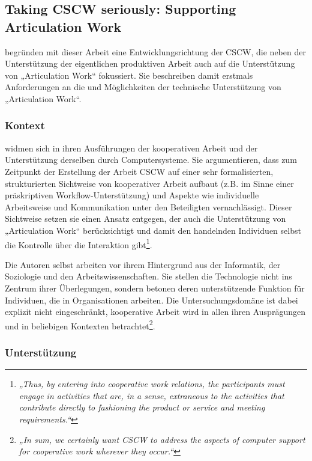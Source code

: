 
\subsection{Taking CSCW seriously: Supporting Articulation Work}

\citet{Schmidt92} begründen mit dieser Arbeit eine Entwicklungsrichtung der \gls{CSCW}, die neben der Unterstützung der eigentlichen produktiven Arbeit auch auf die Unterstützung von „Articulation Work“ fokussiert. Sie beschreiben damit erstmals Anforderungen an die und Möglichkeiten der technische Unterstützung von „Articulation Work“.

\subsubsection{Kontext}

\citet{Schmidt92} widmen sich in ihren Ausführungen der kooperativen Arbeit und der Unterstützung derselben durch Computersysteme. Sie argumentieren, dass zum Zeitpunkt der Erstellung der Arbeit \gls{CSCW} auf einer sehr formalisierten, strukturierten Sichtweise von kooperativer Arbeit aufbaut (z.B. im Sinne einer präskriptiven Workflow-Unterstützung) und Aspekte wie individuelle Arbeitsweise und Kommunikation unter den Beteiligten vernachlässigt. Dieser Sichtweise setzen sie einen Ansatz entgegen, der auch die Unterstützung von „Articulation Work“ berücksichtigt und damit den handelnden Individuen selbst die Kontrolle über die Interaktion gibt\footnote{\emph{„Thus, by entering into cooperative work relations, the participants must engage in activities that are, in a sense, extraneous to the activities that contribute directly to fashioning the product or service and meeting requirements.“}\citep[][S. 8]{Schmidt92}}.

Die Autoren selbst arbeiten vor ihrem Hintergrund aus der Informatik, der Soziologie und den Arbeitswissenschaften. Sie stellen die Technologie nicht ins Zentrum ihrer Überlegungen, sondern betonen deren unterstützende Funktion für  Individuen, die in Organisationen arbeiten. Die Untersuchungsdomäne ist dabei explizit nicht eingeschränkt, kooperative Arbeit wird in allen ihren Ausprägungen und in beliebigen Kontexten betrachtet\footnote{\emph{„In sum, we certainly want CSCW to address the aspects of computer support for cooperative work wherever they occur.“}\citep[][S. 11]{Schmidt92}}.

\subsubsection{Unterstützung}

